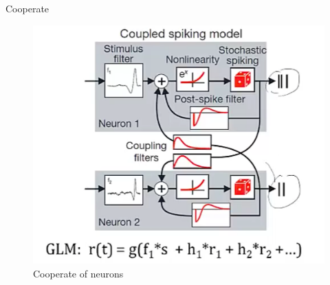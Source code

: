 \documentclass{book}
\begin{document}
Cooperate

\begin{figure}[h]
\centering
\includegraphics[width=0.7\linewidth]{figures/twoneuron}
\caption{Cooperate of neurons}
\label{fig:twoneuron}
\end{figure}

 
\end{document}
